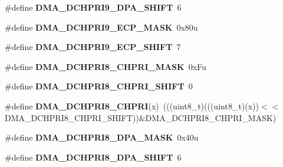 \begin{DoxyCompactItemize}
\item 
\#define {\bfseries D\+M\+A\+\_\+\+D\+C\+H\+P\+R\+I9\+\_\+\+D\+P\+A\+\_\+\+S\+H\+I\+FT}~6\hypertarget{group__DMA__Register__Masks_ga369577ef8e1c3d9eb3756e1a37abe070}{}\label{group__DMA__Register__Masks_ga369577ef8e1c3d9eb3756e1a37abe070}

\item 
\#define {\bfseries D\+M\+A\+\_\+\+D\+C\+H\+P\+R\+I9\+\_\+\+E\+C\+P\+\_\+\+M\+A\+SK}~0x80u\hypertarget{group__DMA__Register__Masks_gadc613e99a97309c8ca4526630226676a}{}\label{group__DMA__Register__Masks_gadc613e99a97309c8ca4526630226676a}

\item 
\#define {\bfseries D\+M\+A\+\_\+\+D\+C\+H\+P\+R\+I9\+\_\+\+E\+C\+P\+\_\+\+S\+H\+I\+FT}~7\hypertarget{group__DMA__Register__Masks_gafabc45696d405cdb5aa873607867d490}{}\label{group__DMA__Register__Masks_gafabc45696d405cdb5aa873607867d490}

\item 
\#define {\bfseries D\+M\+A\+\_\+\+D\+C\+H\+P\+R\+I8\+\_\+\+C\+H\+P\+R\+I\+\_\+\+M\+A\+SK}~0x\+Fu\hypertarget{group__DMA__Register__Masks_ga44efc2d24b92142a4be64cae219e4313}{}\label{group__DMA__Register__Masks_ga44efc2d24b92142a4be64cae219e4313}

\item 
\#define {\bfseries D\+M\+A\+\_\+\+D\+C\+H\+P\+R\+I8\+\_\+\+C\+H\+P\+R\+I\+\_\+\+S\+H\+I\+FT}~0\hypertarget{group__DMA__Register__Masks_gae9ee24ab908f6a1a3551e5ae4bf0bcad}{}\label{group__DMA__Register__Masks_gae9ee24ab908f6a1a3551e5ae4bf0bcad}

\item 
\#define {\bfseries D\+M\+A\+\_\+\+D\+C\+H\+P\+R\+I8\+\_\+\+C\+H\+P\+RI}(x)~(((uint8\+\_\+t)(((uint8\+\_\+t)(x))$<$$<$D\+M\+A\+\_\+\+D\+C\+H\+P\+R\+I8\+\_\+\+C\+H\+P\+R\+I\+\_\+\+S\+H\+I\+FT))\&D\+M\+A\+\_\+\+D\+C\+H\+P\+R\+I8\+\_\+\+C\+H\+P\+R\+I\+\_\+\+M\+A\+SK)\hypertarget{group__DMA__Register__Masks_gaa2368732a13adfa212beaf45f72e6ee0}{}\label{group__DMA__Register__Masks_gaa2368732a13adfa212beaf45f72e6ee0}

\item 
\#define {\bfseries D\+M\+A\+\_\+\+D\+C\+H\+P\+R\+I8\+\_\+\+D\+P\+A\+\_\+\+M\+A\+SK}~0x40u\hypertarget{group__DMA__Register__Masks_ga65d73b58fdc371391eba07e59bec1292}{}\label{group__DMA__Register__Masks_ga65d73b58fdc371391eba07e59bec1292}

\item 
\#define {\bfseries D\+M\+A\+\_\+\+D\+C\+H\+P\+R\+I8\+\_\+\+D\+P\+A\+\_\+\+S\+H\+I\+FT}~6\hypertarget{group__DMA__Register__Masks_gafb506e73fabed6916d50868ca9189bf4}{}\label{group__DMA__Register__Masks_gafb506e73fabed6916d50868ca9189bf4}


\end{DoxyCompactItemize}
